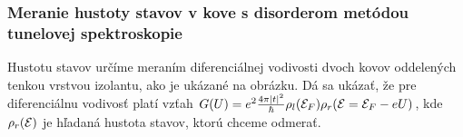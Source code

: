 \documentclass[
	11pt, %
]{beamer}
\begin{document}
\begin{frame}
\frametitle{Meranie hustoty stavov v kove s disorderom metódou tunelovej spektroskopie}
\vspace{-15mm}
\begin{figure}%
    \centering
    \vspace{-10mm}
    \label{fig:example}%
\end{figure}
\small
Hustotu stavov určíme meraním diferenciálnej vodivosti dvoch kovov oddelených tenkou vrstvou izolantu, ako je ukázané na obrázku. 
Dá sa ukázať, že pre diferenciálnu vodivosť platí vzťah
$G(U)=e^2\frac{4\pi|t|^2}{\hbar}\rho_l(\mathcal{E}_F)\rho_r(\mathcal{E}=\mathcal{E}_F-eU)$, kde $\rho_r(\mathcal{E})$ je hľadaná hustota stavov, ktorú chceme odmerať.  
\normalsize
 \end{frame}
\end{document}
